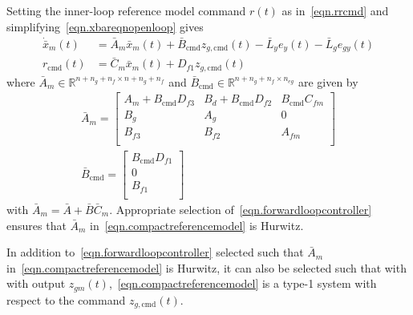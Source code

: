 \documentclass[journal]{IEEEtran}
\theoremstyle{innercustomthm}
\begin{document}
  Setting the inner-loop reference model command $r(t)$ as in\ \eqref{eqn.rrcmd} and simplifying\ \eqref{eqn.xbareqnopenloop} gives
  {%
    \small
    \begin{align}
      \label{eqn.compactreferencemodel}
      \dot{\bar{x}}_{m}(t) &= \bar{A}_{m}\bar{x}_{m}(t) + \bar{B}_{\text{cmd}}z_{g,\text{cmd}}(t) - \bar{L}_{y}e_{y}(t) - \bar{L}_{g}e_{gy}(t) \nonumber \\
      r_{\text{cmd}}(t) &= \bar{C}_{m}\bar{x}_{m}(t) + D_{f1}z_{g,\text{cmd}}(t)
    \end{align}
  }%
  where $\bar{A}_{m}\in\mathbb{R}^{n+n_{g}+n_{f}\times n+n_{g}+n_{f}}$ and $\bar{B}_{\text{cmd}}\in\mathbb{R}^{n+n_{g}+n_{f}\times n_{eg}}$ are given by
  {\small
  \begin{equation*}
    \begin{gathered}
      \bar{A}_{m} =
      \begin{bmatrix}
        A_{m}+B_{\text{cmd}}D_{f3} & B_{d} + B_{\text{cmd}}D_{f2} & B_{\text{cmd}}C_{fm} \\
        B_{g} & A_{g} & 0 \\
        B_{f3} & B_{f2} & A_{fm} \\
      \end{bmatrix} \\
      \bar{B}_{\text{cmd}} =
      \begin{bmatrix}
        B_{\text{cmd}}D_{f1} \\
        0 \\
        B_{f1} \\
      \end{bmatrix}
    \end{gathered}
  \end{equation*}
  }%
  with $\bar{A}_{m} = \bar{A}+\bar{B}\bar{C}_{m}$.
  Appropriate selection of\ \eqref{eqn.forwardloopcontroller} ensures that $\bar{A}_{m}$ in\ \eqref{eqn.compactreferencemodel} is Hurwitz.

  \begin{rem-dan}\label{rem.type1}
    In addition to\ \eqref{eqn.forwardloopcontroller} selected such that $\bar{A}_{m}$ in\ \eqref{eqn.compactreferencemodel} is Hurwitz, it can also be selected such that with with output $z_{gm}(t)$,\ \eqref{eqn.compactreferencemodel} is a type-1 system with respect to the command $z_{g,\text{cmd}}(t)$.
  \end{rem-dan}
\end{document}
